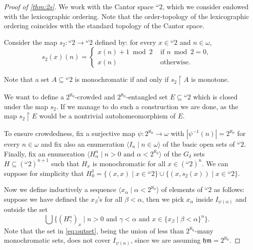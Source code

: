 \documentclass[12pt]{amsart}
\theoremstyle{definition}
\theoremstyle{remark}
\begin{document}
\begin{proof}[Proof of \cref{thm:2s}]
We work with the Cantor space ${}^\omega 2$, which we consider endowed with the lexicographic ordering. Note that the order-topology of the lexicographic ordering  coincides with the standard topology of the Cantor space. 

Consider the map $s_2:{}^\omega 2 \rightarrow {}^\omega 2$ defined by:  for every $x \in {}^\omega 2$ and $n\in\omega$,
\[
s_2(x)(n) = \begin{cases}
x(n)+1 \bmod 2 &\text{ if } n \bmod 2  = 0,\\
x(n)&\text{ otherwise}.
\end{cases}
\] 


Note that a set $A \subseteq {}^\omega 2$ is monochromatic if and only if $s_2 \upharpoonright A$ is monotone.

We want to define a  $2^{\aleph_0}$-crowded and $2^{\aleph_0}$-entangled set $E\subseteq {}^\omega 2$ which is closed under the map $s_2$. If we manage to do such a construction we are done, as the map $s_2 \upharpoonright E$ would be a nontrivial autohomeomorphism of $E$.

To ensure crowdedness, fix a surjective map $\psi: 2^{\aleph_0} \rightarrow \omega$ with $|\psi^{-1}(n)| = 2^{\aleph_0}$ for every $n\in\omega$ and fix also an enumeration $\langle I_n \mid n \in\omega\rangle$ of the basic open sets of ${}^\omega 2$. 
Finally, fix an enumeration $\langle H_\alpha^n \mid n > 0 \text{ and } \alpha < 2^{\aleph_0} \rangle$ of the $G_\delta$ sets $H\subseteq ({}^\omega 2)^{n+1}$ such that $H_x$ is monochromatic for all $x \in ({}^\omega 2)^{n}$. We can suppose for simplicity that $H_0^1 = \{(x,x) \mid x \in {}^\omega 2\} \cup \{(x, s_2(x)) \mid x \in {}^\omega 2\}$.

Now we define inductively a sequence $\langle x_\alpha \mid \alpha < 2^{\aleph_0}\rangle$ of elements of ${}^\omega 2$ as follows: suppose we have defined the $x_\beta$'s for all $\beta < \alpha$, then we pick $x_\alpha$ inside $I_{\psi(\alpha)}$ and outside the set 
\begin{equation}\label{eq:outset}
\bigcup\big\{(H_\gamma^n)_x \mid n > 0 \text{ and } \gamma < \alpha \text{ and } x \in \{x_\beta \mid \beta < \alpha\}^{n}\big\}.
\end{equation}
Note that the set in \eqref{eq:outset}, being the union of less than $2^{\aleph_0}$-many monochromatic sets, does not cover $I_{\psi(\alpha)}$, since we are assuming $\mathfrak{hm} = 2^{\aleph_0}$.


\end{proof}
\end{document}
